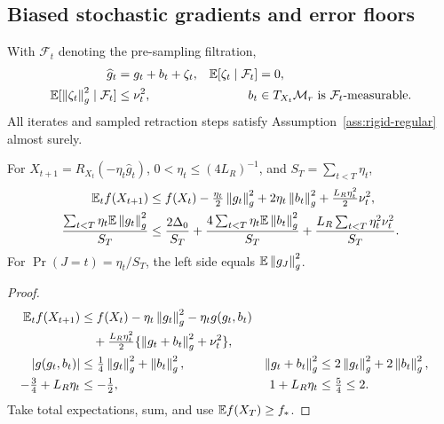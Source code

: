 \subsection{Biased stochastic gradients and error floors}
\begin{assumption}
With $\mathcal F_t$ denoting the pre-sampling filtration,
\begin{align}
\widehat g_t&=g_t+b_t+\zeta_t,&
\mathbb E[\zeta_t\mid\mathcal F_t]&=0,\\
\mathbb E[\left\lVert\zeta_t\right\rVert_g^2\mid\mathcal F_t]&\leq\nu_t^2,&
b_t&\in T_{X_t}\mathcal M_r\text{ is }\mathcal F_t\text{-measurable}.
\end{align}
All iterates and sampled retraction steps satisfy
Assumption~\ref{ass:rigid-regular} almost surely.
\end{assumption}

\begin{theorem}
\label{thm:stochastic}
For $X_{t+1}=R_{X_t}(-\eta_t\widehat g_t)$,
$0<\eta_t\leq(4L_R)^{-1}$, and $S_T=\sum_{t<T}\eta_t$,
\begin{align}
\mathbb E_t f(X_{t+1})
&\leq f(X_t)-\tfrac{\eta_t}{2}\left\lVert g_t\right\rVert_g^2
+2\eta_t\left\lVert b_t\right\rVert_g^2+\tfrac{L_R\eta_t^2}{2}\nu_t^2,\\
\frac{\sum_{t<T}\eta_t\mathbb E\left\lVert g_t\right\rVert_g^2}{S_T}
&\leq\frac{2\Delta_0}{S_T}
+\frac{4\sum_{t<T}\eta_t\mathbb E\left\lVert b_t\right\rVert_g^2}{S_T}
+\frac{L_R\sum_{t<T}\eta_t^2\nu_t^2}{S_T}.
\label{eq:rigid-stochastic}
\end{align}
For $\Pr(J=t)=\eta_t/S_T$, the left side equals $\mathbb E\left\lVert g_J\right\rVert_g^2$.
\end{theorem}
\begin{proof}
\begin{align}
\mathbb E_t f(X_{t+1})
&\leq f(X_t)-\eta_t\left\lVert g_t\right\rVert_g^2-\eta_tg(g_t,b_t)\notag\\
&\quad+\tfrac{L_R\eta_t^2}{2}
\{\left\lVert g_t+b_t\right\rVert_g^2+\nu_t^2\},\\
|g(g_t,b_t)|&\leq\tfrac14\left\lVert g_t\right\rVert_g^2+\left\lVert b_t\right\rVert_g^2,&
\left\lVert g_t+b_t\right\rVert_g^2&\leq2\left\lVert g_t\right\rVert_g^2+2\left\lVert b_t\right\rVert_g^2,\\
-\tfrac34+L_R\eta_t&\leq-\tfrac12,&
1+L_R\eta_t&\leq\tfrac54\leq2 .
\end{align}
Take total expectations, sum, and use $\mathbb E f(X_T)\geq f_*$.
\end{proof}

